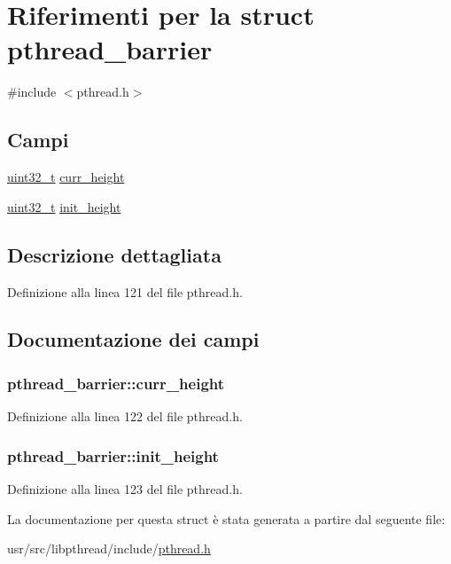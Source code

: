 \hypertarget{structpthread__barrier}{\section{Riferimenti per la struct pthread\+\_\+barrier}
\label{structpthread__barrier}
}


{\ttfamily \#include $<$pthread.\+h$>$}

\subsection*{Campi}
\begin{DoxyCompactItemize}
\item 
\hyperlink{aplus_8h_a53a0df51603c77c2aa5b9ea61b606a82}{uint32\+\_\+t} \hyperlink{structpthread__barrier_a3b8e6f276f11a62fb77525fe5d11b18c}{curr\+\_\+height}
\item 
\hyperlink{aplus_8h_a53a0df51603c77c2aa5b9ea61b606a82}{uint32\+\_\+t} \hyperlink{structpthread__barrier_a71938bf4346ecc8a2f997f18df267ae0}{init\+\_\+height}
\end{DoxyCompactItemize}


\subsection{Descrizione dettagliata}


Definizione alla linea 121 del file pthread.\+h.



\subsection{Documentazione dei campi}
\hypertarget{structpthread__barrier_a3b8e6f276f11a62fb77525fe5d11b18c}{
\subsubsection[{curr\+\_\+height}]{ pthread\+\_\+barrier\+::curr\+\_\+height}}\label{structpthread__barrier_a3b8e6f276f11a62fb77525fe5d11b18c}


Definizione alla linea 122 del file pthread.\+h.

\hypertarget{structpthread__barrier_a71938bf4346ecc8a2f997f18df267ae0}{
\subsubsection[{init\+\_\+height}]{ pthread\+\_\+barrier\+::init\+\_\+height}}\label{structpthread__barrier_a71938bf4346ecc8a2f997f18df267ae0}


Definizione alla linea 123 del file pthread.\+h.



La documentazione per questa struct è stata generata a partire dal seguente file\+:\begin{DoxyCompactItemize}
\item 
usr/src/libpthread/include/\hyperlink{pthread_8h}{pthread.\+h}\end{DoxyCompactItemize}
